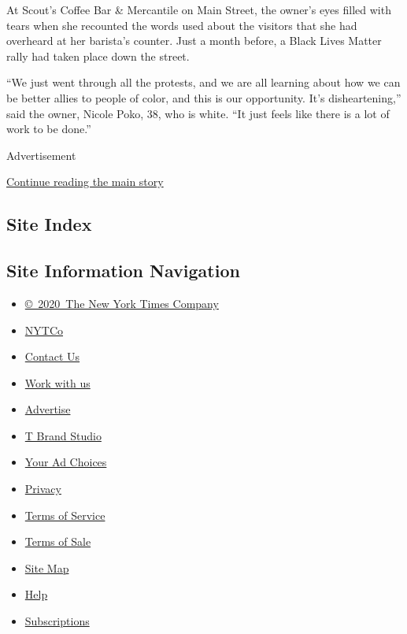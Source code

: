 At Scout's Coffee Bar \& Mercantile on Main Street, the owner's eyes
filled with tears when she recounted the words used about the visitors
that she had overheard at her barista's counter. Just a month before, a
Black Lives Matter rally had taken place down the street.

``We just went through all the protests, and we are all learning about
how we can be better allies to people of color, and this is our
opportunity. It's disheartening,'' said the owner, Nicole Poko, 38, who
is white. ``It just feels like there is a lot of work to be done.''

Advertisement

\protect\hyperlink{after-bottom}{Continue reading the main story}

\hypertarget{site-index}{%
\subsection{Site Index}\label{site-index}}

\hypertarget{site-information-navigation}{%
\subsection{Site Information
Navigation}\label{site-information-navigation}}

\begin{itemize}
\tightlist
\item
  \href{https://help.nytimes.com/hc/en-us/articles/115014792127-Copyright-notice}{©~2020~The
  New York Times Company}
\end{itemize}

\begin{itemize}
\tightlist
\item
  \href{https://www.nytco.com/}{NYTCo}
\item
  \href{https://help.nytimes.com/hc/en-us/articles/115015385887-Contact-Us}{Contact
  Us}
\item
  \href{https://www.nytco.com/careers/}{Work with us}
\item
  \href{https://nytmediakit.com/}{Advertise}
\item
  \href{http://www.tbrandstudio.com/}{T Brand Studio}
\item
  \href{https://www.nytimes.com/privacy/cookie-policy\#how-do-i-manage-trackers}{Your
  Ad Choices}
\item
  \href{https://www.nytimes.com/privacy}{Privacy}
\item
  \href{https://help.nytimes.com/hc/en-us/articles/115014893428-Terms-of-service}{Terms
  of Service}
\item
  \href{https://help.nytimes.com/hc/en-us/articles/115014893968-Terms-of-sale}{Terms
  of Sale}
\item
  \href{https://spiderbites.nytimes.com}{Site Map}
\item
  \href{https://help.nytimes.com/hc/en-us}{Help}
\item
  \href{https://www.nytimes.com/subscription?campaignId=37WXW}{Subscriptions}
\end{itemize}
